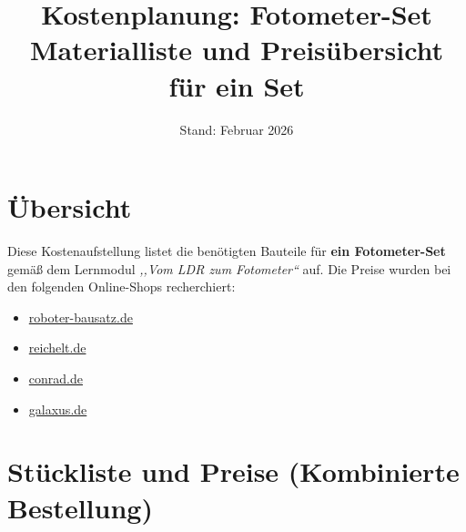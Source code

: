 \documentclass[a4paper,12pt]{article}
\title{%
  \vspace{-1.5cm}
  Kostenplanung: Fotometer-Set\\[6pt]
  \large Materialliste und Preisübersicht für ein Set
}
\date{Stand: Februar 2026}
\begin{document}
\maketitle

\section*{Übersicht}
Diese Kostenaufstellung listet die benötigten Bauteile für \textbf{ein Fotometer-Set}
gemäß dem Lernmodul \emph{,,Vom LDR zum Fotometer``} auf.
Die Preise wurden bei den folgenden Online-Shops recherchiert:

\begin{itemize}
  \item \href{https://www.roboter-bausatz.de}{roboter-bausatz.de}
  \item \href{https://www.reichelt.de}{reichelt.de}
  \item \href{https://www.conrad.de}{conrad.de}
  \item \href{https://www.galaxus.de}{galaxus.de}
\end{itemize}

\noindent


\section{Stückliste und Preise (Kombinierte Bestellung)}
\end{document}
